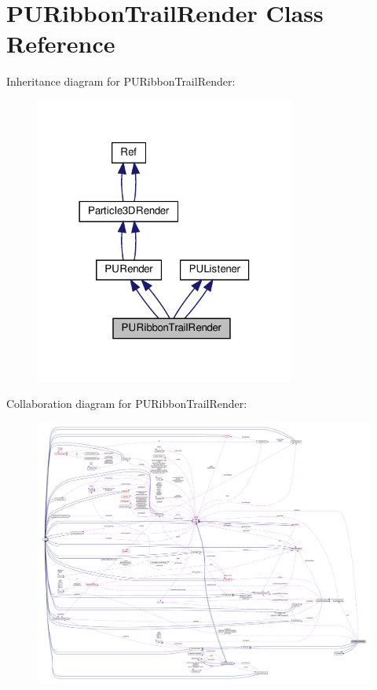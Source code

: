 \hypertarget{classPURibbonTrailRender}{}\section{P\+U\+Ribbon\+Trail\+Render Class Reference}
\label{classPURibbonTrailRender}


Inheritance diagram for P\+U\+Ribbon\+Trail\+Render\+:
\nopagebreak
\begin{figure}[H]
\begin{center}
\leavevmode
\includegraphics[width=242pt]{classPURibbonTrailRender__inherit__graph}
\end{center}
\end{figure}


Collaboration diagram for P\+U\+Ribbon\+Trail\+Render\+:
\nopagebreak
\begin{figure}[H]
\begin{center}
\leavevmode
\includegraphics[width=350pt]{classPURibbonTrailRender__coll__graph}
\end{center}
\end{figure}
